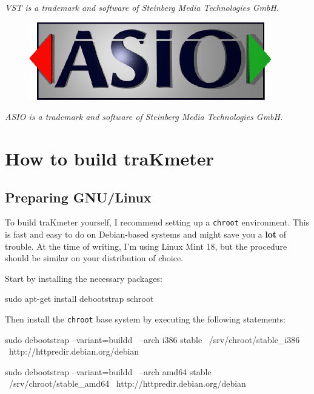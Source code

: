 \emph{VST is a trademark and software of Steinberg Media Technologies
  GmbH.}

\begin{figure}
  \includegraphics[scale=0.60,clip]{include/images/trademark_asio.png}
\end{figure}

\emph{ASIO is a trademark and software of Steinberg Media Technologies
  GmbH.}

\appendix

\chapter{How to build traKmeter}
\label{chap:build_trakmeter}

\section{Preparing GNU/Linux}

To build traKmeter yourself, I recommend setting up a \texttt{chroot}
environment.  This is fast and easy to do on Debian-based systems and
might save you a \textbf{lot} of trouble.  At the time of writing, I'm
using Linux Mint 18, but the procedure should be similar on your
distribution of choice.

Start by installing the necessary packages:

\begin{VerbatimBoth}
  sudo apt-get install debootstrap schroot
\end{VerbatimBoth}

Then install the \texttt{chroot} base system by executing the
following statements:

\begin{Verbatim32}
  sudo debootstrap --variant=buildd \
    --arch i386 stable \
    /srv/chroot/stable_i386 \
    http://httpredir.debian.org/debian
\end{Verbatim32}

\begin{Verbatim64}
  sudo debootstrap --variant=buildd \
    --arch amd64 stable \
    /srv/chroot/stable_amd64 \
    http://httpredir.debian.org/debian
\end{Verbatim64}

